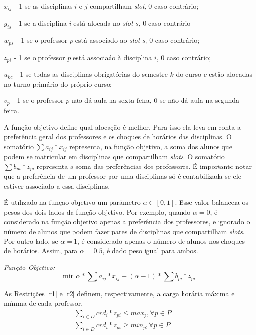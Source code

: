 \begin{alineascomponto}
    \item $x_{ij}$ - 1 se as disciplinas  $i$ e $j$ compartilham \textit{slot}, 0 caso contrário;
	\item $y_{is}$ - 1 se a disciplina $i$ está alocada no \textit{slot} $s$, 0 caso contrário
	\item $w_{ps}$ - 1 se o professor $p$ está associado ao \textit{slot} $s$, 0 caso contrário;
	\item $z_{pi}$ - 1 se o professor $p$ está associado à disciplina $i$, 0 caso contrário;
	\item $u_{kc}$ - 1 se todas as disciplinas obrigatórias do semestre $k$ do curso $c$ estão alocadas no turno primário do próprio curso;
	\item $v_p$ - 1 se o professor $p$ não dá aula na sexta-feira, 0 se não dá aula na segunda-feira.
\end{alineascomponto} 

A função objetivo define qual alocação é melhor. Para isso ela leva em conta a preferência geral dos professores e os choques de horários das disciplinas. O somatório $\sum a_{ij} * x_{ij}$ representa, na função objetivo, a soma dos alunos que podem se matricular em disciplinas que compartilham \textit{slots}. O somatório $\sum b_{pi} * z_{pi}$ representa a soma das preferências dos professores. É importante notar que a preferência de um professor por uma disciplinas só é contabilizada se ele estiver associado a essa disciplinas.

É utilizado na função objetivo um parâmetro $\alpha\in[0,1]$. Esse valor balanceia os pesos dos dois lados da função objetivo. Por exemplo, quando $\alpha = 0$, é considerado na função objetivo apenas a preferência dos professores, e ignorado o número de alunos que podem fazer pares de disciplinas que compartilham \textit{slots}. Por outro lado, se $\alpha = 1$, é considerado apenas o número de alunos nos choques de horários. Assim, para $\alpha = 0.5$, é dado peso igual para ambos.

\emph{Função Objetivo:}
$$
\min{\alpha * \sum a_{ij} * x_{ij} + (\alpha-1) * \sum b_{pi} * z_{pi}}
$$

As Restrições \ref{r1} e \ref{r2} definem, respectivamente, a carga horária máxima e mínima de cada professor.
\begin{eqnarray}
\label{r1}
\sum_{i\in{D}}^{}{crd_i * z_{pi}} \le max_p, \forall{p}\in{P} &&\\
\label{r2}
\sum_{i\in{D}}^{}{crd_i * z_{pi}} \ge min_p, \forall{p}\in{P} &&
\end{eqnarray}

